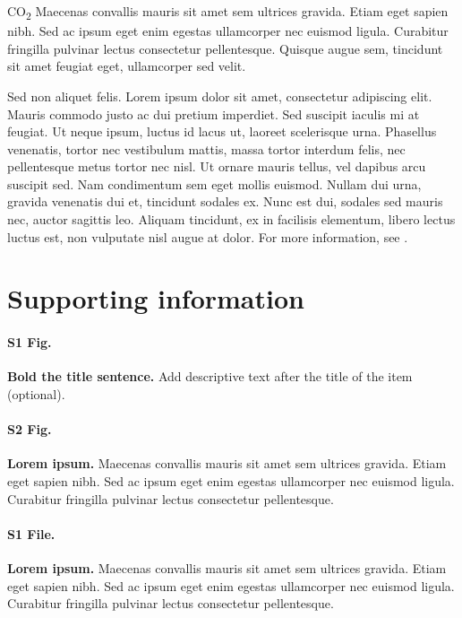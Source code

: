 \documentclass[10pt,letterpaper]{article}
\begin{document}
CO\textsubscript{2} Maecenas convallis mauris sit amet sem ultrices gravida. Etiam eget sapien nibh. Sed ac ipsum eget enim egestas ullamcorper nec euismod ligula. Curabitur fringilla pulvinar lectus consectetur pellentesque. Quisque augue sem, tincidunt sit amet feugiat eget, ullamcorper sed velit. 

Sed non aliquet felis. Lorem ipsum dolor sit amet, consectetur adipiscing elit. Mauris commodo justo ac dui pretium imperdiet. Sed suscipit iaculis mi at feugiat. Ut neque ipsum, luctus id lacus ut, laoreet scelerisque urna. Phasellus venenatis, tortor nec vestibulum mattis, massa tortor interdum felis, nec pellentesque metus tortor nec nisl. Ut ornare mauris tellus, vel dapibus arcu suscipit sed. Nam condimentum sem eget mollis euismod. Nullam dui urna, gravida venenatis dui et, tincidunt sodales ex. Nunc est dui, sodales sed mauris nec, auctor sagittis leo. Aliquam tincidunt, ex in facilisis elementum, libero lectus luctus est, non vulputate nisl augue at dolor. For more information, see .

\section*{Supporting information}

\paragraph*{S1 Fig.}
\label{S1_Fig}
{\bf Bold the title sentence.} Add descriptive text after the title of the item (optional).

\paragraph*{S2 Fig.}
\label{S2_Fig}
{\bf Lorem ipsum.} Maecenas convallis mauris sit amet sem ultrices gravida. Etiam eget sapien nibh. Sed ac ipsum eget enim egestas ullamcorper nec euismod ligula. Curabitur fringilla pulvinar lectus consectetur pellentesque.

\paragraph*{S1 File.}
\label{S1_File}
{\bf Lorem ipsum.}  Maecenas convallis mauris sit amet sem ultrices gravida. Etiam eget sapien nibh. Sed ac ipsum eget enim egestas ullamcorper nec euismod ligula. Curabitur fringilla pulvinar lectus consectetur pellentesque.
\end{document}
